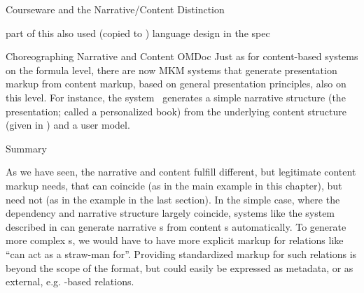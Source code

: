 \begin{omgroup}[id=courseware]{Courseware and the Narrative/Content Distinction}
\begin{oldpart}{part of this also used (copied to ) language design in the spec}
\begin{omgroup}[id=courseware.choreographing]{Choreographing  Narrative and Content OMDoc}
Just as for content-based systems on the formula level, there are now MKM systems that
generate presentation markup from content markup, based on general presentation
principles, also on this level. For instance, the {}
system~\cite{MelBue:krma03} generates a simple narrative structure (the
presentation; called a personalized book) from the underlying content structure (given in
{\omdoc}) and a user model.
\end{omgroup}
\end{oldpart}

\begin{omgroup}[id=courseware.summary]{Summary}

  As we have seen, the narrative and content fulfill different, but legitimate content
  markup needs, that can coincide (as in the main example in this chapter), but need not
  (as in the example in the last section). In the simple case, where the dependency and
  narrative structure largely coincide, systems like the {\activemath} system described in
  {} can generate narrative {\omdoc}s from content {\omdoc}s
  automatically. To generate more complex {s}, we would
  have to have more explicit markup for relations like ``can act as a straw-man for''.
  Providing standardized markup for such relations is beyond the scope of the {\omdoc}
  format, but could easily be expressed as metadata, or as external, e.g.  {\rdf}-based
  relations.
\end{omgroup}
\end{omgroup}



